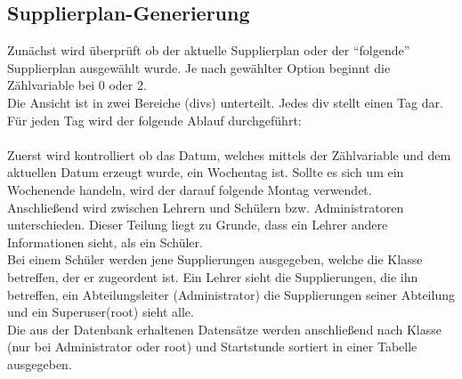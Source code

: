 \subsection{Supplierplan-Generierung}

Zunächst wird überprüft ob der aktuelle Supplierplan oder der \enquote{folgende} Supplierplan ausgewählt wurde. Je nach gewählter Option beginnt die Zählvariable bei 0 oder 2.\\
Die Ansicht ist in zwei Bereiche (divs) unterteilt. Jedes div stellt einen Tag dar.\\
Für jeden Tag wird der folgende Ablauf durchgeführt:\\\\
Zuerst wird kontrolliert ob das Datum, welches mittels der Zählvariable und dem aktuellen Datum erzeugt wurde, ein Wochentag ist. Sollte es sich um ein Wochenende handeln, wird der darauf folgende Montag verwendet.\\
Anschließend wird zwischen Lehrern und Schülern bzw. Administratoren unterschieden. Dieser Teilung liegt zu Grunde, dass ein Lehrer andere Informationen sieht, als ein Schüler.
\\
Bei einem Schüler werden jene Supplierungen ausgegeben, welche die Klasse betreffen, der er zugeordent ist. Ein Lehrer sieht die Supplierungen, die ihn betreffen, ein Abteilungsleiter (Administrator) die Supplierungen seiner Abteilung und ein Superuser(root) sieht alle.\\
Die aus der Datenbank erhaltenen Datensätze werden anschließend nach Klasse (nur bei Administrator oder root) und Startstunde sortiert in einer Tabelle ausgegeben.

%
%
%
% 
%
